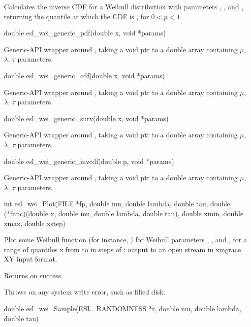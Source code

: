 \begin{sreapi}
Calculates the inverse CDF for a Weibull distribution
with parameters , , and , returning
the quantile  at which the CDF is , for $0<p<1$.


\hypertarget{func:esl_wei_generic_pdf()}
{\item[double esl\_wei\_generic\_pdf(double x, void *params)]}

Generic-API wrapper around , taking
a void ptr to a double array containing $\mu$, $\lambda$,
$\tau$ parameters.


\hypertarget{func:esl_wei_generic_cdf()}
{\item[double esl\_wei\_generic\_cdf(double x, void *params)]}

Generic-API wrapper around , taking
a void ptr to a double array containing $\mu$, $\lambda$,
$\tau$ parameters.


\hypertarget{func:esl_wei_generic_surv()}
{\item[double esl\_wei\_generic\_surv(double x, void *params)]}

Generic-API wrapper around , taking
a void ptr to a double array containing $\mu$, $\lambda$,
$\tau$ parameters.


\hypertarget{func:esl_wei_generic_invcdf()}
{\item[double esl\_wei\_generic\_invcdf(double p, void *params)]}

Generic-API wrapper around , taking
a void ptr to a double array containing $\mu$, $\lambda$,
$\tau$ parameters.


\hypertarget{func:esl_wei_Plot()}
{\item[int esl\_wei\_Plot(FILE *fp, double mu, double lambda, double tau,
	     double (*func)(double x, double mu, double lambda, double tau), 
	     double xmin, double xmax, double xstep)]}

Plot some Weibull function  (for instance, )
for Weibull parameters , , and , for a range of
quantiles x from  to  in steps of ;
output to an open stream  in xmgrace XY input format.

Returns  on success.

Throws  on any system write error, such as filled disk.


\hypertarget{func:esl_wei_Sample()}
{\item[double esl\_wei\_Sample(ESL\_RANDOMNESS *r, double mu, double lambda, double tau)]}


\end{sreapi}
